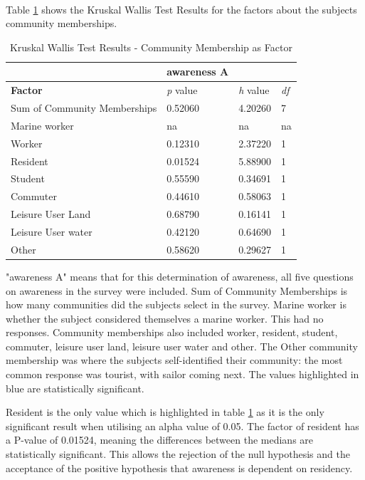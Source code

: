 \paragraph{}


Table \ref{kw_test_com_membership} shows the Kruskal Wallis Test Results for the factors about the subjects community memberships. 


\begin{table}[H]
    \centering
    \begin{tabular}{|l|l|l|l|}
    \hline
         ~ & \textbf{awareness A} & ~ & ~ \\ \hline
        \textbf{Factor} &\textit{p} value &\textit{h} value & \textit{df} \\ \hline
        Sum of Community Memberships & 0.52060 & 4.20260 & 7 \\ \hline
        Marine worker & na & na & na \\ \hline
        Worker & 0.12310 & 2.37220 & 1 \\ \hline
        Resident & \cellcolor[HTML]{7df9ff} 0.01524 & 5.88900 & 1 \\ \hline
        Student & 0.55590 & 0.34691 & 1 \\ \hline
        Commuter & 0.44610 & 0.58063 & 1 \\ \hline
        Leisure User Land & 0.68790 & 0.16141 & 1 \\ \hline
        Leisure User water & 0.42120 & 0.64690 & 1 \\ \hline
        Other & 0.58620 & 0.29627 & 1 \\ \hline
    \end{tabular}
    \caption{Kruskal Wallis Test Results - Community Membership as Factor}{ "awareness A" means that for this determination of awareness, all five questions on awareness in the survey were included. Sum of Community Memberships is how many communities did the subjects select in the survey. Marine worker is whether the subject considered themselves a marine worker. This had no responses. Community memberships also included worker, resident, student, commuter, leisure user land, leisure user water and other. The Other community membership was where the subjects self-identified their community: the most common response was tourist, with sailor coming next. The values highlighted in blue are statistically significant.}
    \label{kw_test_com_membership}
\end{table}
Resident is the only value which is highlighted in table \ref{kw_test_com_membership} as it is the only significant result when utilising an alpha value of 0.05. The factor of resident has a P-value of 0.01524, meaning the differences between the medians are statistically significant. This allows the rejection of the null hypothesis and the acceptance of the positive hypothesis that awareness is dependent on residency. 
